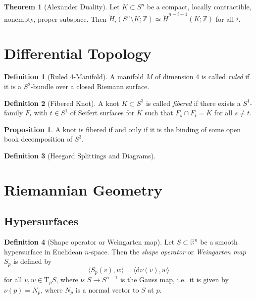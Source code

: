 \documentclass[a4paper]{article}
\newcommand{\RR}{\mathbb{R}}
\newcommand{\ZZ}{\mathbb{Z}}
\newcommand{\dd}{\mathrm{d}}
\newcommand{\lra}{\longrightarrow}
\newcommand{\wt}[1]{\widetilde{#1}}
\newcommand{\ts}{\mathrm{T}}
\theoremstyle{definition}
\newtheorem{thm}{Theorem}
\newtheorem{prop}{Proposition}
\theoremstyle{definition}
\newtheorem{definition}{Definition}
\theoremstyle{remark}
\theoremstyle{remark}
\theoremstyle{remark}
\begin{document}
\begin{thm}[Alexander Duality]
  Let $K\subset S^n$ be a compact, locally contractible, nonempty, proper subspace. Then $\wt{H}_i(S^n\setminus K;\ZZ)\simeq \wt{H}^{n-i-1}(K;\ZZ)$ for all $i$.
\end{thm}

\section{Differential Topology}

\begin{definition}[Ruled $4$-Manifold]
  A manifold $M$ of dimension $4$ is called \emph{ruled} if it is a $S^2$-bundle over a closed Riemann surface.
\end{definition}

\begin{definition}[Fibered Knot]
  A knot $K\subset S^3$ is called \emph{fibered} if there exists a $S^1$-family $F_t$ with $t\in S^1$ of Seifert surfaces for $K$ such that $F_s\cap F_t=K$ for all $s\neq t$.
\end{definition}

\begin{prop}
  A knot is fibered if and only if it is the binding of some open book decomposition of $S^3$.
\end{prop}

\begin{definition}[Heegard Splittings and Diagrams]
  
\end{definition}

\section{Riemannian Geometry}

\subsection{Hypersurfaces}

\begin{definition}[Shape operator or Weingarten map]
  Let $S\subset\RR^n$ be a smooth hypersurface in Euclidean $n$-space. Then the \emph{shape operator} or \emph{Weingarten map} $S_p$ is defined by
  \begin{equation*}
    \langle S_p(v),w\rangle=\langle \dd\nu(v),w\rangle
  \end{equation*}
  for all $v,w\in\ts_pS$, where $\nu:S\lra S^{n-1}$ is the Gauss map, i.e.\ it is given by $\nu(p)=N_p$, where $N_p$ is a normal vector to $S$ at $p$.
\end{definition}
\end{document}
